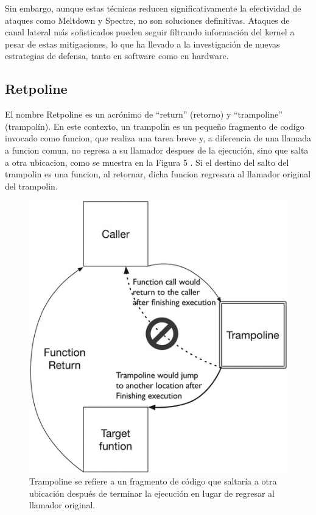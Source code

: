 \documentclass[lettersize,compsoc]{IEEEtran}
\begin{document}
\noindent Sin embargo, aunque estas técnicas reducen significativamente la efectividad de ataques como Meltdown y Spectre, no son soluciones definitivas. Ataques de canal lateral más sofisticados pueden seguir filtrando información del kernel a pesar de estas mitigaciones, lo que ha llevado a la investigación de nuevas estrategias de defensa, tanto en software como en hardware.

\subsection{Retpoline}
El nombre Retpoline es un acrónimo de “return” (retorno) y “trampoline” (trampolín). En este contexto, un trampolin es un pequeño fragmento de codigo invocado como funcion, que realiza una tarea breve y, a diferencia de una llamada a funcion comun, no regresa a su llamador despues de la ejecución, sino que salta a otra ubicacion, como se muestra en la Figura 5
. Si el destino del salto del trampolin es una funcion, al retornar, dicha funcion regresara al llamador original del trampolin.
\begin{figure}[h]
  \centering
  \includegraphics[width=\linewidth]{../retpoline.jpg}
  \caption{\small Trampoline se refiere a un fragmento de código que saltaría a otra ubicación después de terminar la ejecución en lugar de regresar al llamador original.}
\end{figure}
\end{document}
